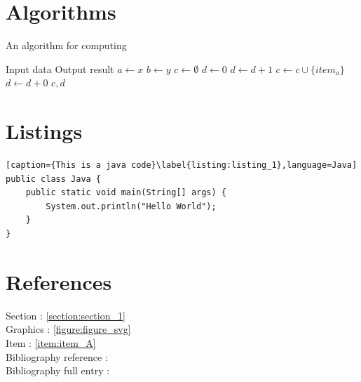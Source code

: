 \newpage


\section{Algorithms}

\begin{algorithm}
\caption{An algorithm for computing} \label{algorithm:algorithm_1}
\begin{algorithmic}[1] %
    \Require Input data
    \Ensure Output result
    \State $a \gets x$
    \State $b \gets y$
    \State $c \gets \emptyset$
        \State $d \gets 0$
                \State $d \gets d + 1$
                \State $c \gets c \cup \{ item_a \} $
            \Else
                \State $d \gets d + 0$
            \EndIf
        \EndFor
    \EndFor
    \State \Return $c,d$
\EndProcedure
\end{algorithmic}
\end{algorithm}


\newpage


\section{Listings}

\begin{lstlisting}[caption={This is a java code}\label{listing:listing_1},language=Java] 
public class Java {
    public static void main(String[] args) {
        System.out.println("Hello World");
    }
}
\end{lstlisting}

\newpage


\section{References}
Section : \ref{section:section_1} \\
Graphics : \ref{figure:figure_svg} \\
Item : \ref{item:item_A} \\
Bibliography reference : \cite{lamport1991latex} \\
Bibliography full entry : 

